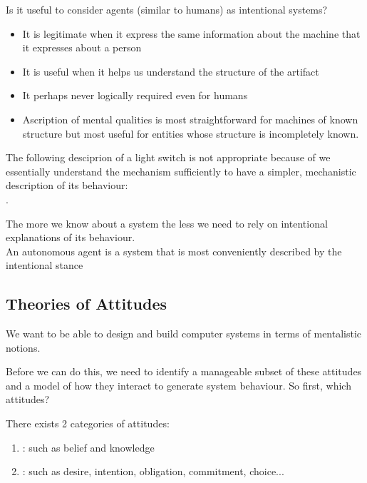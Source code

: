 Is it useful to consider agents (similar to humans) as intentional systems?
\begin{itemize}
\item It is legitimate when it express the same information about the machine that it expresses about a person
\item It is useful when it helps us understand the structure of the artifact
\item It perhaps never logically required even for humans
\item Ascription of mental qualities is most straightforward for machines of known structure but most useful for entities whose structure is incompletely known.
\end{itemize}

The following desciprion of a light switch is not appropriate because of we essentially understand the mechanism sufficiently to have a simpler, mechanistic description of its behaviour:\\
.

The more we know about a system the less we need to rely on intentional explanations of its behaviour.\\
An autonomous agent is a system that is most conveniently described by the intentional stance
\subsection{Theories of Attitudes}
We want to be able to design and build computer systems in terms of mentalistic notions.

Before we can do this, we need to identify a manageable subset of these attitudes and a model of how they interact to generate system behaviour. So first, which attitudes?

There exists 2 categories of attitudes:
\begin{enumerate}
\item {}: such as belief and knowledge
\item {}: such as desire, intention, obligation, commitment, choice...
\end{enumerate}
